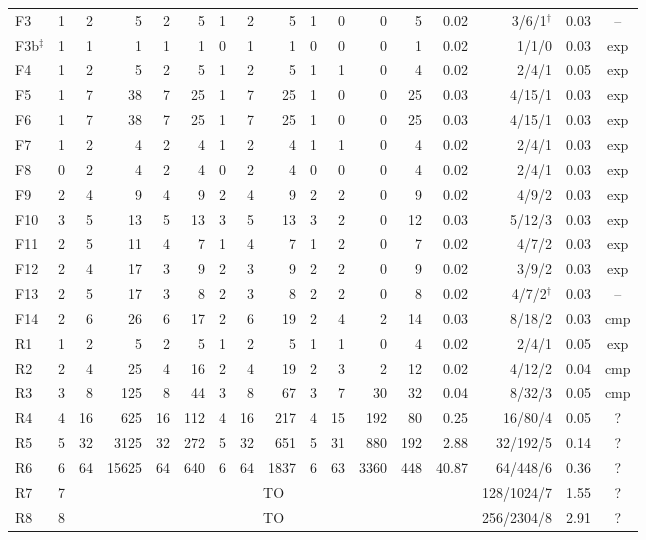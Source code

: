 \begin{table}[t]
\begin{tabular}{@{}lrrrrrrrrrrrrrrrc@{}}
F3 & 1 & 2 & 5 & 2 & 5 & 1 & 2 & 5 & 1 & 0 & 0 & 5 & 0.02 & 3/6/1$^\dagger$ & 0.03 & --\\
F3b$^\ddagger$ & 1 & 1 & 1 & 1 & 1 & 0 & 1 & 1 & 0 & 0 & 0 & 1 & 0.02 & 1/1/0 & 0.03 & exp\\
F4 & 1 & 2 & 5 & 2 & 5 & 1 & 2 & 5 & 1 & 1 & 0 & 4 & 0.02 & 2/4/1 & 0.05 & exp\\
F5 & 1 & 7 & 38 & 7 & 25 & 1 & 7 & 25 & 1 & 0 & 0 & 25 & 0.03 & 4/15/1 & 0.03 & exp\\
F6 & 1 & 7 & 38 & 7 & 25 & 1 & 7 & 25 & 1 & 0 & 0 & 25 & 0.03 & 4/15/1 & 0.03 & exp\\
F7 & 1 & 2 & 4 & 2 & 4 & 1 & 2 & 4 & 1 & 1 & 0 & 4 & 0.02 & 2/4/1 & 0.03 & exp\\
F8 & 0 & 2 & 4 & 2 & 4 & 0 & 2 & 4 & 0 & 0 & 0 & 4 & 0.02 & 2/4/1 & 0.03 & exp\\
F9 & 2 & 4 & 9 & 4 & 9 & 2 & 4 & 9 & 2 & 2 & 0 & 9 & 0.02 & 4/9/2 & 0.03 & exp\\
F10 & 3 & 5 & 13 & 5 & 13 & 3 & 5 & 13 & 3 & 2 & 0 & 12 & 0.03 & 5/12/3 & 0.03 & exp\\
F11 & 2 & 5 & 11 & 4 & 7 & 1 & 4 & 7 & 1 & 2 & 0 & 7 & 0.02 & 4/7/2 & 0.03 & exp\\
F12 & 2 & 4 & 17 & 3 & 9 & 2 & 3 & 9 & 2 & 2 & 0 & 9 & 0.02 & 3/9/2 & 0.03 & exp\\
F13 & 2 & 5 & 17 & 3 & 8 & 2 & 3 & 8 & 2 & 2 & 0 & 8 & 0.02 & 4/7/2$^\dagger$ & 0.03 & --\\
F14 & 2 & 6 & 26 & 6 & 17 & 2 & 6 & 19 & 2 & 4 & 2 & 14 & 0.03 & 8/18/2 & 0.03 & cmp\\
R1 & 1 & 2 & 5 & 2 & 5 & 1 & 2 & 5 & 1 & 1 & 0 & 4 & 0.02 & 2/4/1 & 0.05 & exp\\
R2 & 2 & 4 & 25 & 4 & 16 & 2 & 4 & 19 & 2 & 3 & 2 & 12 & 0.02 & 4/12/2 & 0.04 & cmp\\
R3 & 3 & 8 & 125 & 8 & 44 & 3 & 8 & 67 & 3 & 7 & 30 & 32 & 0.04 & 8/32/3 & 0.05 & cmp\\
R4 & 4 & 16 & 625 & 16 & 112 & 4 & 16 & 217 & 4 & 15 & 192 & 80 & 0.25 & 16/80/4 & 0.05 & ?\\
R5 & 5 & 32 & 3125 & 32 & 272 & 5 & 32 & 651 & 5 & 31 & 880 & 192 & 2.88 & 32/192/5 & 0.14 & ?\\
R6 & 6 & 64 & 15625 & 64 & 640 & 6 & 64 & 1837 & 6 & 63 & 3360 & 448 & 40.87 & 64/448/6 & 0.36 & ?\\
R7 & 7 & \multicolumn{12}{c}{TO} & 128/1024/7 & 1.55 & ?\\
R8 & 8 & \multicolumn{12}{c}{TO} & 256/2304/8 & 2.91 & ?\\

\end{tabular}
\end{table}
